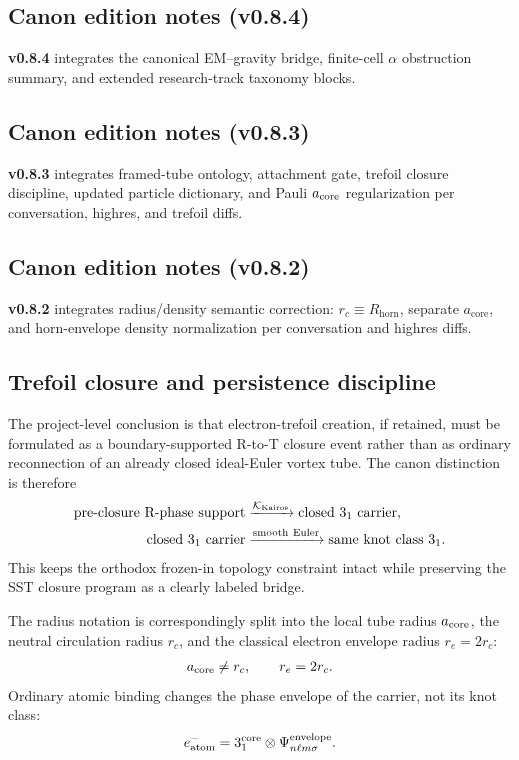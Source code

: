 \documentclass[11pt]{article}
\theoremstyle{definition}
\theoremstyle{plain}
\theoremstyle{remark}
\newcommand{\rc}{{r_c}}
\begin{document}
        \subsection{Canon edition notes (v0.8.4)}
            \textbf{v0.8.4} integrates the canonical EM--gravity bridge, finite-cell $\alpha$ obstruction summary, and extended research-track taxonomy blocks.

        \subsection{Canon edition notes (v0.8.3)}
            \textbf{v0.8.3} integrates framed-tube ontology, attachment gate, trefoil closure discipline, updated particle dictionary, and Pauli $a_{\rm core}$ regularization per conversation, highres, and trefoil diffs.

        \subsection{Canon edition notes (v0.8.2)}
            \textbf{v0.8.2} integrates radius/density semantic correction: $\rc \equiv R_{\mathrm{horn}}$, separate $a_{\mathrm{core}}$, and horn-envelope density normalization per conversation and highres diffs.


        \subsection{Trefoil closure and persistence discipline}
            The project-level conclusion is that electron-trefoil creation, if
            retained, must be formulated as a boundary-supported R-to-T closure
            event rather than as ordinary reconnection of an already closed
            ideal-Euler vortex tube. The canon distinction is therefore
            \begin{align}
                \text{pre-closure R-phase support}
                &\xrightarrow{\mathcal{K}_{\rm Kairos}}
                \text{closed }3_1\text{ carrier},\\
                \text{closed }3_1\text{ carrier}
                &\xrightarrow{\rm smooth\ Euler}
                \text{same knot class }3_1 .
            \end{align}
            This keeps the orthodox frozen-in topology constraint intact while
            preserving the SST closure program as a clearly labeled bridge.

            The radius notation is correspondingly split into the local tube
            radius \(a_{\rm core}\), the neutral circulation radius \(\rc\), and
            the classical electron envelope radius \(r_e=2\rc\):
            \begin{align}
                a_{\rm core} \neq \rc,
                \qquad
                r_e=2\rc .
            \end{align}
            Ordinary atomic binding changes the phase envelope of the carrier,
            not its knot class:
            \begin{align}
                e^-_{\rm atom}
                =
                3_1^{\rm core}\otimes\Psi_{n\ell m\sigma}^{\rm envelope} .
            \end{align}
\end{document}
